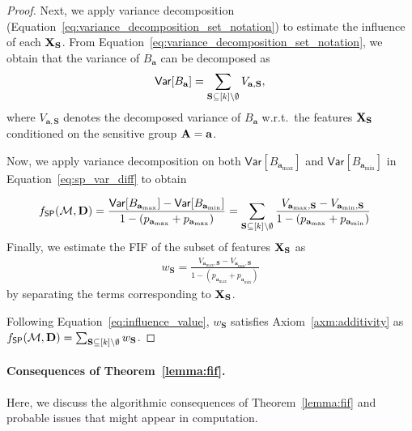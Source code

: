 \begin{proof}
	
	Next, we apply variance decomposition (Equation~\eqref{eq:variance_decomposition_set_notation}) to estimate the influence of each $ \mathbf{X}_{\mathbf{S}} $. From Equation~\eqref{eq:variance_decomposition_set_notation}, we obtain that the variance of $ B_{\mathbf{a}} $ can be decomposed as 
	\[ \mathsf{Var}[B_\mathbf{a}] = \sum_{\mathbf{S} \subseteq [k] \setminus \emptyset} V_{\mathbf{a}, \mathbf{S}},\] 
	where $ V_{\mathbf{a}, \mathbf{S}} $ denotes the decomposed variance of $ B_\mathbf{a} $ w.r.t.\ the features $ \mathbf{X}_{\mathbf{S}} $ conditioned on the sensitive group $ \mathbf{A} = \mathbf{a} $. 
	
	Now, we apply variance decomposition on both $ \mathsf{Var}[B_{\mathbf{a}_{\max}}] $ and $ \mathsf{Var}[B_{\mathbf{a}_{\min}}] $ in Equation~\ref{eq:sp_var_diff} to obtain
	
	\begin{align}
	f_{\mathsf{SP}}(\mathcal{M}, \mathbf{D}) & = \frac{\mathsf{Var}[B_{\mathbf{a}_{\max}}] - \mathsf{Var}[B_{\mathbf{a}_{\min}}]}{1 - (p_{\mathbf{a}_{\max}} + p_{\mathbf{a}_{\max}})}= \sum_{\mathbf{S} \subseteq [k] \setminus \emptyset} \frac{V_{\mathbf{a}_{\max}, \mathbf{S}} - V_{\mathbf{a}_{\min}, \mathbf{S}}}{1 - (p_{\mathbf{a}_{\max}} + p_{\mathbf{a}_{\min}})} \label{eq:influence_value}
	\end{align}
	Finally, we estimate  the FIF of the subset of features $ \mathbf{X}_{\mathbf{S}}  $ as 
	\begin{align}
	w_{\mathbf{S}}  = \frac{V_{\mathbf{a}_{\max}, \mathbf{S}} - V_{\mathbf{a}_{\min}, \mathbf{S}}}{1 - (p_{\mathbf{a}_{\max}} + p_{\mathbf{a}_{\min}})}
	\end{align} 
	by separating the terms corresponding to $ \mathbf{X}_{\mathbf{S}} $.
	
	Following Equation~\eqref{eq:influence_value}, $	w_{\mathbf{S}} $ satisfies Axiom~\ref{axm:additivity} as $f_{\mathsf{SP}}(\mathcal{M}, \mathbf{D}) = \sum_{\mathbf{S} \subseteq [k] \setminus \emptyset} w_{\mathbf{S}} $.
\end{proof}


\paragraph{Consequences of Theorem~\ref{lemma:fif}.} Here, we discuss the algorithmic consequences of Theorem~\ref{lemma:fif} and probable issues that might appear in computation.

